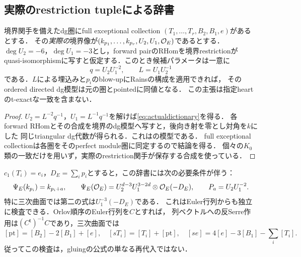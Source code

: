 \subsection{実際のrestriction tupleによる辞書}
\begin{proposition}[境界像からのpointed復元]\label{prop:actualdictionary}
境界関手を備えたdg圏にfull exceptional collection
$(T_1,\ldots,T_r,B_2,B_1,e)$があるとする．
その\emph{実際の}境界像が$(k_{p_1},\ldots,k_{p_r},U_2,U_1,\mathcal O_E)$であるとする．
$\deg U_2=-6$，$\deg U_1=-3$とし，forward pairのRHomを境界restrictionが
quasi-isomorphismに写すと仮定する．このとき候補パラメータは一意に
\begin{equation}\label{eq:actualdictionary}
 q=U_2U_1^{-2},\qquad L=U_1U_2^{-1}
\end{equation}
である．$L$による埋込みと$p_i$のblow-upにRainsの構成を適用できれば，
そのordered directed dg模型は元の圏とpointedに同値となる．
この主張は指定heartのt-exactな一致を含まない．
\end{proposition}
\begin{proof}
$U_2=L^{-2}q^{-1}$，$U_1=L^{-1}q^{-1}$を解けば\eqref{eq:actualdictionary}を得る．
各forward RHomとその合成を境界のdg模型へ写すと，後向き射を零とし対角を$k$にした
同じtriangular dg代数が得られる．これは\cite[(4.11)]{Filtered}の模型である．
full exceptional collectionは各圏をそのperfect module圏に同定するので結論を得る．
個々の$K_0$類の一致だけを用いず，実際のrestriction関手が保存する合成を使っている．
\end{proof}

$c_1(T_i)=e_i$，$D_E=\sum_i p_i$とすると，この辞書には次の必要条件が伴う：
\begin{equation}\label{eq:dictionarycompatibility}
 \Psi_E(k_{p_i})=k_{p_i+a},\qquad
 \Psi_E(\mathcal O_E)=U_2^{d-3}U_1^{3-2d}\otimes\mathcal O_E(-D_E),
 \qquad P_a=U_2U_1^{-2}.
\end{equation}
特に三次曲面では第二の式は$U_1^{-3}(-D_E)$である．
これはEuler行列からも独立に検査できる．Orlov順序のEuler行列を$C$とすれば，
列ベクトルへの反Serre作用は$(C^{\mathsf t})^{-1}C$であり，三次曲面では
\begin{equation}\label{eq:point-class-audit}
 [\mathrm{pt}]=[B_2]-2[B_1]+[e],\quad
 [sT_i]=[T_i]+[\mathrm{pt}],\quad
 [se]=4[e]-3[B_1]-\sum_i[T_i].
\end{equation}
従ってこの検査は，gluingの公式の単なる再代入ではない．

